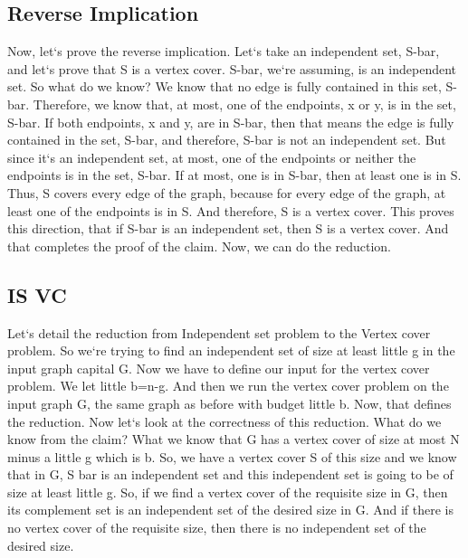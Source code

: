 \subsection{Reverse Implication}
Now, let`s prove the reverse implication.
Let`s take an independent set, S-bar, and let`s prove that S is a vertex cover.
S-bar, we`re assuming, is an independent set.
So what do we know? We know that no edge is fully contained in this set, S-bar.
Therefore, we know that, at most, one of the endpoints, x or y, is in the set, S-bar.
If both endpoints, x and y, are in S-bar, then that means the edge is fully contained in the set, S-bar, and therefore, S-bar is not an independent set.
But since it`s an independent set, at most, one of the endpoints or neither the endpoints is in the set, S-bar.
If at most, one is in S-bar, then at least one is in S\@.
Thus, S covers every edge of the graph, because for every edge of the graph, at least one of the endpoints is in S\@.
And therefore, S is a vertex cover.
This proves this direction, that if S-bar is an independent set, then S is a vertex cover.
And that completes the proof of the claim.
Now, we can do the reduction.

\subsection{IS VC}
Let`s detail the reduction from Independent set problem to the Vertex cover problem.
So we`re trying to find an independent set of size at least little g in the input graph capital G\@.
Now we have to define our input for the vertex cover problem.
We let little b=n-g.
And then we run the vertex cover problem on the input graph G, the same graph as before with budget little b.
Now, that defines the reduction.
Now let`s look at the correctness of this reduction.
What do we know from the claim? What we know that G has a vertex cover of size at most N minus a little g which is b.
So, we have a vertex cover S of this size and we know that in G, S bar is an independent set and this independent set is going to be of size at least little g.
So, if we find a vertex cover of the requisite size in G, then its complement set is an independent set of the desired size in G\@.
And if there is no vertex cover of the requisite size, then there is no independent set of the desired size.

